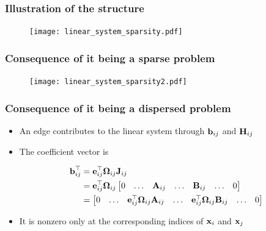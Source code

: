     \begin{frame}
    \frametitle{Illustration of the structure}
    
    \begin{figure}[!h]
    \texttt{[image: linear\_system\_sparsity.pdf]}
    \end{figure}
    
    \end{frame}
    
    \begin{frame}
    \frametitle{Consequence of it being a sparse problem}
    
    \begin{figure}[!h]
    \texttt{[image: linear\_system\_sparsity2.pdf]} 
    \end{figure}
    
    \end{frame}
    
    \begin{frame}
     \frametitle{Consequence of it being a dispersed problem}
    
     \begin{itemize}
     \item An edge contributes to the linear system through $\boldsymbol{\mathbf{b}}_{ij}$ and $\boldsymbol{\mathbf{H}}_{ij}$
     \item The coefficient vector is
    
     \begin{align*}
     \boldsymbol{\mathbf{b}}_{ij}^{\top} &= \boldsymbol{\mathbf{e}}_{ij}^{\top}\boldsymbol{\mathbf{\Omega}}_{ij}\boldsymbol{\mathbf{J}}_{ij}\\
     &= \boldsymbol{\mathbf{e}}_{ij}^{\top}\boldsymbol{\mathbf{\Omega}}_{ij}
     \begin{bmatrix}
     0 & \dots & \boldsymbol{\mathbf{A}}_{ij} & \dots & \boldsymbol{\mathbf{B}}_{ij} & \dots & 0
    \end{bmatrix}\\
    &=
    \begin{bmatrix}
    0 & \dots & \boldsymbol{\mathbf{e}}_{ij}^{\top}\boldsymbol{\mathbf{\Omega}}_{ij}\boldsymbol{\mathbf{A}}_{ij} & \dots & \boldsymbol{\mathbf{e}}_{ij}^{\top}\boldsymbol{\mathbf{\Omega}}_{ij}\boldsymbol{\mathbf{B}}_{ij} & \dots & 0
    \end{bmatrix}
    \end{align*}
    \item It is nonzero only at the corresponding indices of $\boldsymbol{\mathbf{x}}_{i}$ and $\boldsymbol{\mathbf{x}}_{j}$
    \end{itemize}
    
    \end{frame}
    
